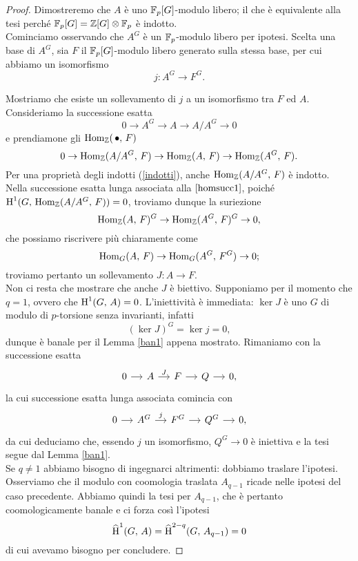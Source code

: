 \begin{proof}
	Dimostreremo che $ A $ è uno $ \mathbb{F}_p[G] $-modulo libero; il che è equivalente alla tesi perché $ \mathbb{F}_p[G] = \mathbb{Z}[G] \otimes \mathbb{F}_p $ è indotto. \\
	
	Cominciamo osservando che $ A^G $ è un $ \mathbb{F}_p $-modulo libero per ipotesi. Scelta una base di $ A^G $, sia $ F $ il $ \mathbb{F}_p[G] $-modulo libero generato sulla stessa base, per cui abbiamo un isomorfismo
	\[ j \colon A^G \to F^G. \]
	
	Mostriamo che esiste un sollevamento di $ j $ a un isomorfismo tra $ F $ ed $ A $. Consideriamo la successione esatta
	\[ 0 \to A^G \to A \to A/A^G \to 0 \]
	e prendiamone gli $ \operatorname{Hom}_{\mathbb{Z}}(\, \bullet, \, F) $
	\begin{equation}\label{homsucc1}
		0 \to \operatorname{Hom}_{\mathbb{Z}}(A/A^G, \, F) \to \operatorname{Hom}_{\mathbb{Z}}(A, \, F) \to \operatorname{Hom}_{\mathbb{Z}}(A^G, \, F).
	\end{equation}
	Per una proprietà degli indotti (\ref{indotti}), anche $ \operatorname{Hom}_{\mathbb{Z}}(A/A^G, \, F) $ è indotto. Nella successione esatta lunga associata alla $ \ref{homsucc1} $, poiché $ \operatorname{H}^1(G, \, \operatorname{Hom}_{\mathbb{Z}}(A/A^G, \, F)) = 0 $, troviamo dunque la suriezione
	\[ \operatorname{Hom}_{\mathbb{Z}}(A, \, F)^G \to \operatorname{Hom}_{\mathbb{Z}}(A^G, \, F)^G \to 0, \]
	che possiamo riscrivere più chiaramente come
	\[ \operatorname{Hom}_G(A, \, F) \to \operatorname{Hom}_G(A^G, \, F^G) \to 0; \]
	troviamo pertanto un sollevamento $ J \colon A \to F $.\\
	
	Non ci resta che mostrare che anche $ J $ è biettivo. Supponiamo per il momento che $ q = 1 $, ovvero che $ \operatorname{H}^1(G, \, A) = 0 $. L'iniettività è immediata: $ \ker J $ è uno $ G $ di modulo di $ p $-torsione senza invarianti, infatti
	\[ (\ker J)^G = \ker j = 0, \]
	dunque è banale per il Lemma \ref{ban1} appena mostrato. Rimaniamo con la successione esatta
	\[ \begin{tikzcd}[column sep = small]
	0 \rar& A \rar["J"]& F \rar& Q \rar& 0,
	\end{tikzcd} \]
	la cui successione esatta lunga associata comincia con
	\[ \begin{tikzcd}[column sep = small]
	0 \rar & A^G \rar["j"] & F^G \rar & Q^G \rar & 0,
	\end{tikzcd} \]
	da cui deduciamo che, essendo $ j $ un isomorfismo, $ Q^G \to 0 $ è iniettiva e la tesi segue dal Lemma \ref{ban1}.\\
	
	Se $ q \neq 1 $ abbiamo bisogno di ingegnarci altrimenti: dobbiamo traslare l'ipotesi. Osserviamo che il modulo con coomologia traslata $ A_{q-1} $ ricade nelle ipotesi del caso precedente. Abbiamo quindi la tesi per $ A_{q-1} $, che è pertanto coomologicamente banale e ci forza così l'ipotesi 
	\[ \operatorname{\widehat{H}}^1(G, \, A) = \operatorname{\widehat{H}}^{2-q}(G, \, A_{q-1}) = 0 \]
	di cui avevamo bisogno per concludere.
\end{proof}

